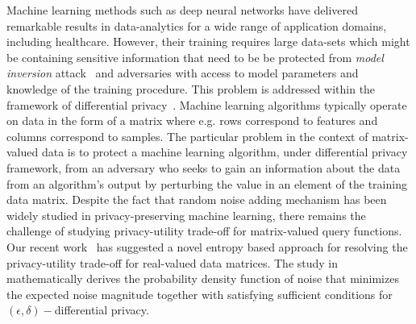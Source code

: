 \noindent
\label{sec:dataanalytics}
\noindent
Machine learning methods such as deep neural networks have delivered remarkable results in data-analytics for a wide range of application domains, including healthcare. However, their training requires large data-sets which might be containing sensitive information that need to be be protected from \emph{model inversion} attack~\cite{Fredrikson:2015:MIA:2810103.2813677} and adversaries with access to model parameters and knowledge of the training procedure. This problem is addressed within the framework of differential privacy~\cite{Abadi:2016:DLD:2976749.2978318,Phan:2016:DPP:3015812.3016005}. Machine learning algorithms typically operate on data in the form of a matrix where e.g. rows correspond to features and columns correspond to samples. The particular problem in the context of matrix-valued data is to protect a machine learning algorithm, under differential privacy framework, from an adversary who seeks to gain an information about the data from an algorithm's output by perturbing the value in an element of the training data matrix. Despite the fact that random noise adding mechanism has been widely studied in privacy-preserving machine learning, there remains the challenge of studying privacy-utility trade-off for matrix-valued query functions. Our recent work~\cite{Kumar/IWCFS2019} has suggested a novel entropy based approach for resolving the privacy-utility trade-off for real-valued data matrices. The study in~\cite{Kumar/IWCFS2019}  mathematically derives the probability density function of noise that minimizes the expected noise magnitude together with satisfying sufficient conditions for $(\epsilon,\delta)-$differential privacy.

